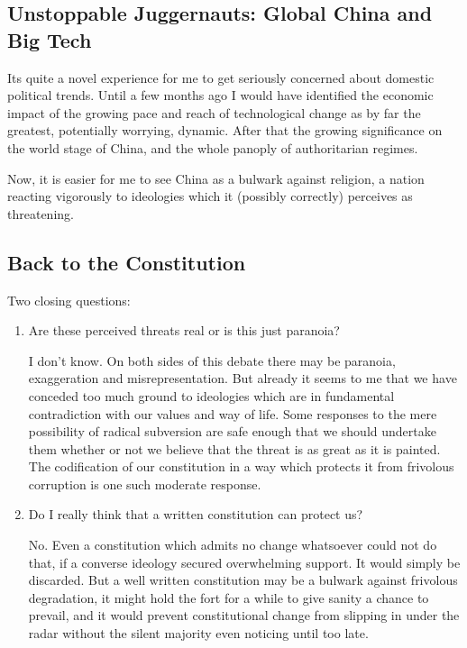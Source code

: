 \documentclass[14pt,titlepage]{extarticle}
\begin{document}
\subsection{Unstoppable Juggernauts: Global China and Big Tech}

Its quite a novel experience for me to get seriously concerned about domestic political trends.
Until a few months ago I would have identified the economic impact of the growing pace and reach of technological change as by far the greatest, potentially worrying, dynamic.
After that the growing significance on the world stage of China, and the whole panoply of authoritarian regimes.

Now, it is easier for me to see China as a bulwark against religion, a nation reacting vigorously to ideologies which it (possibly correctly) perceives as threatening.

\subsection{Back to the Constitution}

Two closing questions:

\begin{enumerate}
\item Are these perceived threats real or is this just paranoia?

  I don't know.
  On both sides of this debate there may be paranoia, exaggeration and misrepresentation.
  But already it seems to me that we have conceded too much ground to ideologies which are in fundamental contradiction with our values and way of life.
  Some responses to the mere possibility of radical subversion are safe enough that we should undertake them whether or not we believe that the threat is as great as it is painted.
  The codification of our constitution in a way which protects it from frivolous corruption is one such moderate response.

\item Do I really think that a written constitution can protect us?

  No.
  Even a constitution which admits no change whatsoever could not do that, if a converse ideology secured overwhelming support.
  It would simply be discarded.
  But a well written constitution may be a bulwark against frivolous degradation, it might hold the fort for a while to give sanity a chance to prevail, and it would prevent constitutional change from slipping in under the radar without the silent majority even noticing until too late.
\end{enumerate}
\end{document}
